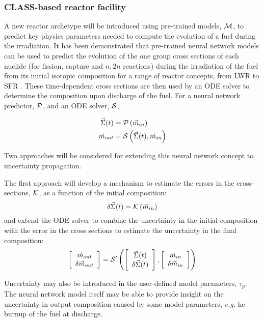 \documentclass[dvips,12pt]{article}
\newcommand{\uncvector}[1]
{ \left[ \begin{array}{c} #1 \\ \delta #1 \end{array} \right] }
\begin{document}
\subsubsection{CLASS-based reactor facility}

A new reactor archetype will be introduced using
pre-trained models, ${\cal M}$, to predict key
physics parameters needed to compute the evolution
of a fuel during the irradiation. It has been
demonstrated that pre-trained neural network
models can be used to predict the evolution of the
one group cross sections of each nuclide (for
fission, capture and $n,2n$ reactions) during the
irradiation of the fuel from its initial isotopic
composition for a range of reactor concepts, from
LWR to SFR \cite{Leniau.ANE.2015, Leniau.PHYSOR.2016}.
These time-dependent cross sections are then used
by an ODE solver to determine the composition upon
discharge of the fuel.  For a neural network
predictor, ${\cal P}$, and an ODE solver, ${\cal S}$,

\begin{align}
  \vec{\Sigma}(t) &= {\cal P}\left( \vec{m}_{in}\right)\\
  \vec{m}_{out} &= {\cal S}\left( \vec{\Sigma}(t), \vec{m}_{in}\right)
\end{align}

Two approaches will be considered for extending
this neural network concept to uncertainty
propagation.

The first approach will develop a mechanism to
estimate the errors in the cross-sections, 
${\cal K}$, as a function of the initial composition:
\begin{equation}
  \delta\vec{\Sigma}(t) = {\cal K}\left( \vec{m}_{in}\right)
\end{equation}
and extend the ODE solver to combine the
uncertainty in the initial composition with the
error in the cross sections to estimate the
uncertainty in the final composition:
\begin{equation}
  \uncvector{\vec{m}_{out}} = {\cal S^\prime}\left( \uncvector{\vec{\Sigma}(t)}, \uncvector{\vec{m}_{in}}\right)
\end{equation}

Uncertainty may also be introduced in the
user-defined model parameters, $\tau_p$.  The
neural network model itself may be able to provide
insight on the uncertainty in output composition
caused by some model parameters, \textit{e.g.} he
burnup of the fuel at discharge.
\end{document}
